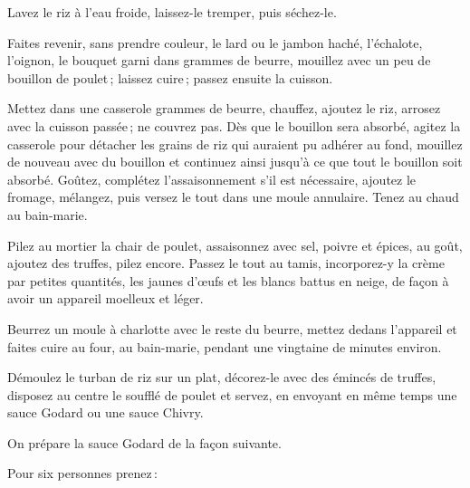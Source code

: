 Lavez le riz à l'eau froide, laissez-le tremper, puis séchez-le.

Faites revenir, sans prendre couleur, le lard ou le jambon haché, l’échalote,
l'oignon, le bouquet garni dans {\mmm} grammes de beurre, mouillez avec un peu de
bouillon de poulet ; laissez cuire ; passez ensuite la cuisson.

Mettez dans une casserole {\mmm} grammes de beurre, chauffez, ajoutez le riz,
arrosez avec la cuisson passée ; ne couvrez pas. Dès que le bouillon sera
absorbé, agitez la casserole pour détacher les grains de riz qui auraient pu
adhérer au fond, mouillez de nouveau avec du bouillon et continuez ainsi
jusqu'à ce que tout le bouillon soit absorbé. Goûtez, complétez
l'assaisonnement s'il est nécessaire, ajoutez le fromage, mélangez, puis versez
le tout dans une moule annulaire. Tenez au chaud au bain-marie.

Pilez au mortier la chair de poulet, assaisonnez avec sel, poivre et épices, au
goût, ajoutez des truffes, pilez encore. Passez le tout au tamis, incorporez-y
la crème par petites quantités, les jaunes d'œufs et les blancs battus en
neige, de façon à avoir un appareil moelleux et léger.

Beurrez un moule à charlotte avec le reste du beurre, mettez dedans l'appareil
et faites cuire au four, au bain-marie, pendant une vingtaine de minutes
environ.

Démoulez le turban de riz sur un plat, décorez-le avec des émincés de truffes,
disposez au centre le soufflé de poulet et servez, en envoyant en même temps
une sauce Godard ou une sauce Chivry.

\sk

On prépare la sauce Godard de la façon suivante.

Pour six personnes prenez :

\medskip

